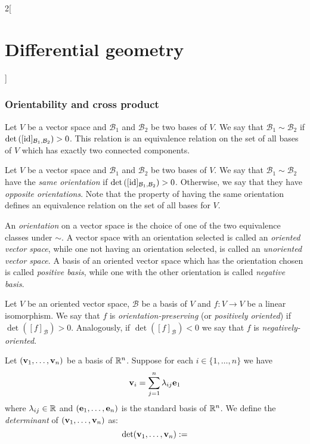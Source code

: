 \documentclass[../../../main.tex]{subfiles}
\begin{document}
\begin{multicols}{2}[\section{Differential geometry}]
  \subsubsection{Orientability and cross product}
  \begin{definition}
    Let $V$ be a vector space and $\mathcal{B}_1$ and $\mathcal{B}_2$ be two bases of $V$. We say that $\mathcal{B}_1\sim\mathcal{B}_2$ if $\det\left([\mathrm{id}]_{\mathcal{B}_1,\mathcal{B}_2}\right)>0$. This relation is an equivalence relation on the set of all bases of $V$ which has exactly two connected components.
  \end{definition}
  \begin{definition}
    Let $V$ be a vector space and $\mathcal{B}_1$ and $\mathcal{B}_2$ be two bases of $V$. We say that $\mathcal{B}_1\sim\mathcal{B}_2$ have the \emph{same orientation} if $\det\left([\mathrm{id}]_{\mathcal{B}_1,\mathcal{B}_2}\right)>0$. Otherwise, we say that they have \emph{opposite orientations}. Note that the property of having the same orientation defines an equivalence relation on the set of all bases for $V$.
  \end{definition}
  \begin{definition}
    An \emph{orientation} on a vector space is the choice of one of the two equivalence classes under $\sim$. A vector space with an orientation selected is called an \emph{oriented vector space}, while one not having an orientation selected, is called an \emph{unoriented vector space}. A basis of an oriented vector space which has the orientation chosen is called \emph{positive basis}, while one with the other orientation is called \emph{negative basis}.
  \end{definition}
  \begin{definition}
    Let $V$ be an oriented vector space, $\mathcal{B}$ be a basis of $V$ and $f:V\rightarrow V$ be a linear isomorphism. We say that $f$ is \emph{orientation-preserving} (or \emph{positively oriented}) if $\det \left([f]_{\mathcal{B}}\right)>0$. Analogously, if $\det \left([f]_{\mathcal{B}}\right)<0$ we say that $f$ is \emph{negatively-oriented}.
  \end{definition}
  \begin{definition}
    Let $(\boldsymbol{\mathrm{v}}_1,\ldots,\boldsymbol{\mathrm{v}}_n)$ be a basis of $\mathbb{R}^n$. Suppose for each $i\in\{1,\ldots,n\}$ we have $$\boldsymbol{\mathrm{v}}_i=\sum_{j=1}^n\lambda_{ij}\boldsymbol{\mathrm{e}}_1$$ where $\lambda_{ij}\in\mathbb{R}$ and $(\boldsymbol{\mathrm{e}}_1,\ldots,\boldsymbol{\mathrm{e}}_n)$ is the standard basis of $\mathbb{R}^n$. We define the \emph{determinant} of $(\boldsymbol{\mathrm{v}}_1,\ldots,\boldsymbol{\mathrm{v}}_n)$ as: $$\det(\boldsymbol{\mathrm{v}}_1,\ldots,\boldsymbol{\mathrm{v}}_n):=
$$
\end{definition}
\end{multicols}
\end{document}
